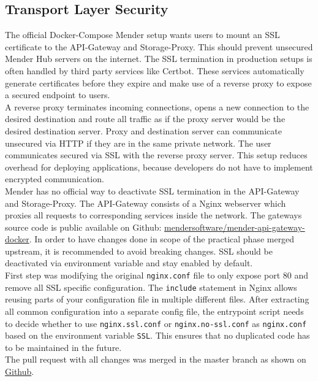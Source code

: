 \subsection{Transport Layer Security}
The official Docker-Compose Mender setup wants users to mount an SSL certificate to the API-Gateway and Storage-Proxy. This should prevent unsecured Mender Hub servers on the internet. The SSL termination in production setups is often handled by third party services like Certbot. These services automatically generate certificates before they expire and make use of a reverse proxy to expose a secured endpoint to users.\\
A reverse proxy terminates incoming connections, opens a new connection to the desired destination and route all traffic as if the proxy server would be the desired destination server. Proxy and destination server can communicate unsecured via HTTP if they are in the same private network. The user communicates secured via SSL with the reverse proxy server. This setup reduces overhead for deploying applications, because developers do not have to implement encrypted communication.\\
Mender has no official way to deactivate SSL termination in the API-Gateway and Storage-Proxy. The API-Gateway consists of a Nginx webserver which proxies all requests to corresponding services inside the network. The gateways source code is public available on Github: \href{https://github.com/mendersoftware/mender-api-gateway-docker}{mendersoftware/mender-api-gateway-docker}. In order to have changes done in scope of the practical phase merged upstream, it is recommended to avoid breaking changes. SSL should be deactivated via environment variable and stay enabled by default.\\
First step was modifying the original \verb|nginx.conf| file to only expose port 80 and remove all SSL specific configuration. The \verb|include| statement in Nginx allows reusing parts of your configuration file in multiple different files. After extracting all common configuration into a separate config file, the entrypoint script needs to decide whether to use \verb|nginx.ssl.conf| or \verb|nginx.no-ssl.conf| as \verb|nginx.conf| based on the environment variable \verb|SSL|. This ensures that no duplicated code has to be maintained in the future.\\
The pull request with all changes was merged in the master branch as shown on \href{https://github.com/mendersoftware/mender-api-gateway-docker/pull/109}{Github}.\\

